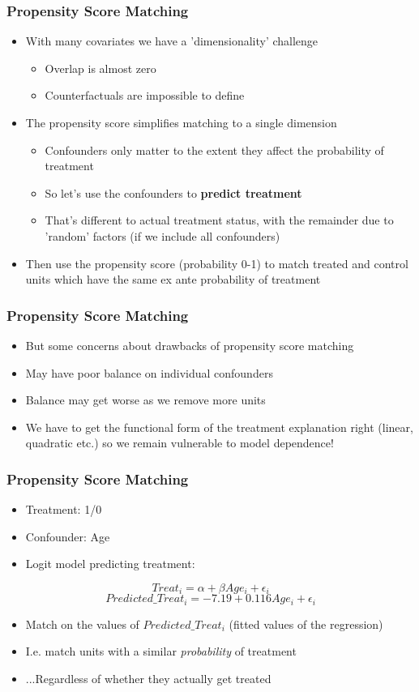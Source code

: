 \documentclass[xcolor=x11names,compress]{beamer}\usepackage[]{graphicx}\usepackage[]{color}
\renewcommand{\(}{\begin{columns}}
\renewcommand{\)}{\end{columns}}
\newcommand{\<}[1]{\begin{column}{#1}}
\renewcommand{\>}{\end{column}}
\begin{document}
\begin{frame}
\frametitle{Propensity Score Matching}
\begin{itemize}
\item With many covariates we have a 'dimensionality' challenge
\pause
\begin{itemize}
\item Overlap is almost zero
\pause
\item Counterfactuals are impossible to define
\end{itemize}
\item The propensity score simplifies matching to a single dimension
\pause
\begin{itemize}
\item Confounders only matter to the extent they affect the probability of treatment
\pause
\item So let's use the confounders to \textbf{predict treatment}
\pause
\item That's different to actual treatment status, with the remainder due to 'random' factors (if we include all confounders)
\pause
\end{itemize}
\item Then use the propensity score (probability 0-1) to match treated and control units which have the same ex ante probability of treatment
\end{itemize}
\end{frame}

\begin{frame}
\frametitle{Propensity Score Matching}
\begin{itemize}
\item But some concerns about drawbacks of propensity score matching
\pause
\item May have poor balance on individual confounders
\pause
\item Balance may get worse as we remove more units
\pause
\item We have to get the functional form of the treatment explanation right (linear, quadratic etc.) so we remain vulnerable to model dependence!
\end{itemize}
\end{frame}

\begin{frame}
\frametitle{Propensity Score Matching}
\begin{itemize}
\item Treatment: 1/0
\item Confounder: Age
\item Logit model predicting treatment:
\end{itemize}
$$Treat_i = \alpha + \beta Age_i +\epsilon_i$$
\pause
$$Predicted\_Treat_i = -7.19 + 0.116 Age_i +\epsilon_i$$
\pause
\begin{itemize}
\item Match on the values of $Predicted\_Treat_i$ (fitted values of the regression)
\pause
\item I.e. match units with a similar \textit{probability} of treatment
\pause
\item ...Regardless of whether they actually get treated
\end{itemize}
\end{frame}
\end{document}
